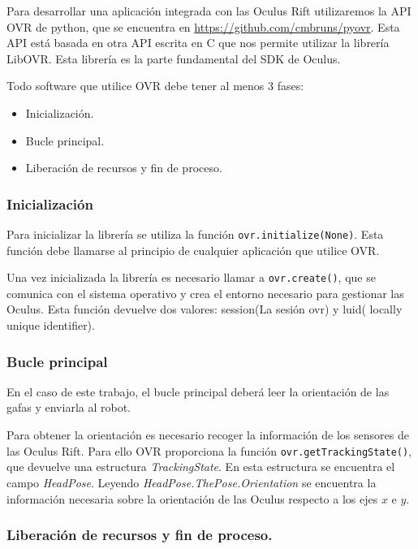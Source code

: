 \documentclass[twoside, 11pt]{epstfg}
\begin{document}
Para desarrollar una aplicación integrada con las Oculus Rift utilizaremos la API OVR de python, que se encuentra en \url{https://github.com/cmbruns/pyovr}. Esta API está basada en otra API escrita en C que nos permite utilizar la librería LibOVR. Esta librería es la parte fundamental del SDK de Oculus.

Todo software que utilice OVR debe tener al menos 3 fases:
\begin{itemize}
	\item Inicialización.
	\item Bucle principal.
	\item Liberación de recursos y fin de proceso. 
\end{itemize}

\subsubsection{Inicialización}


Para inicializar la librería se utiliza la función \texttt{ovr.initialize(None)}. Esta función debe llamarse al principio de cualquier aplicación que utilice OVR.

Una vez inicializada la librería es necesario llamar a \texttt{ovr.create()}, que se comunica con el sistema operativo y crea el entorno necesario para gestionar las Oculus. Esta función devuelve dos valores: session(La sesión ovr) y luid( locally unique identifier). 

\subsubsection{Bucle principal}

En el caso de este trabajo, el bucle principal deberá leer la orientación de las gafas y enviarla al robot.

Para obtener la orientación es necesario recoger la información de los sensores de las Oculus Rift. Para ello OVR proporciona la función \texttt{ovr.getTrackingState()}, que devuelve una estructura \textit{TrackingState}. En esta estructura se encuentra el campo \textit{HeadPose}. Leyendo \textit{HeadPose.ThePose.Orientation} se encuentra la información necesaria sobre la orientación de las Oculus respecto a los ejes $x$ e $y$.

\subsubsection{Liberación de recursos y fin de proceso.}
\end{document}
